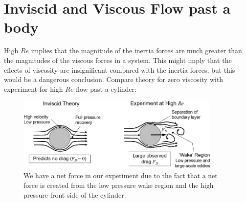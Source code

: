 \documentclass[class=report, crop=false, 12pt,a4paper]{standalone}
\begin{document}
\section{Inviscid and Viscous Flow past a body}
High $Re$ implies that the magnitude of the inertia forces are much greater than the magnitudes of the viscous forces in a system. This might imply that the effects of viscosity are insignificant compared with the inertia forces, but this would be a dangerous conclusion. Compare theory for zero viscosity with experiment for high $Re$ flow past a cylinder:
\begin{figure}[H]
  \centering
  \includegraphics[width = 0.9\textwidth]{../img/diagram28.png}
  \caption{We have a net force in our experiment due to the fact that a net force is created from the low pressure wake region and the high pressure front side of the cylinder.}
\end{figure}
\end{document}
